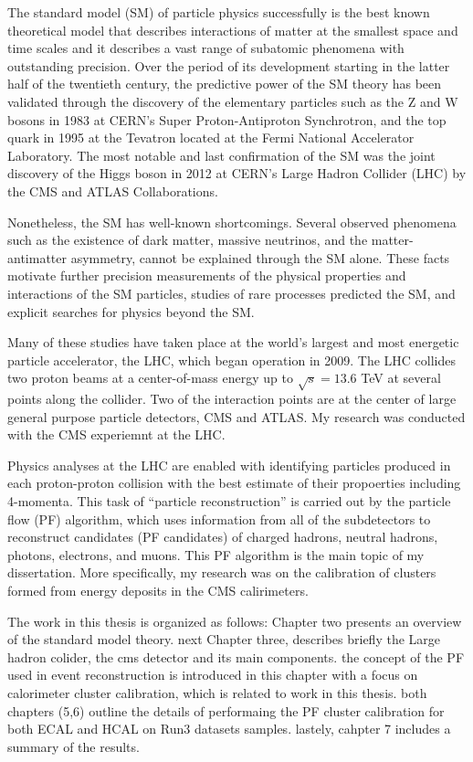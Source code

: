 
The standard model (SM) of particle physics successfully is the best known theoretical model that describes interactions of matter at the smallest space and time scales
and it describes a vast range of subatomic phenomena with outstanding precision.
Over the period of its development starting in the latter half of the twentieth century, the predictive power of the SM theory has been validated through the discovery of the elementary particles such as the Z and W bosons in 1983 at CERN's Super Proton-Antiproton Synchrotron, and the top quark in 1995 at the Tevatron located at the Fermi National Accelerator Laboratory.
The most notable and last confirmation of the SM was the joint discovery of the Higgs boson in 2012 at CERN's Large Hadron Collider (LHC) by the CMS and ATLAS Collaborations.

Nonetheless, the SM has well-known shortcomings.
Several observed phenomena such as the existence of dark matter, massive neutrinos, and the matter-antimatter asymmetry, cannot be explained through the SM alone.
These facts motivate further precision measurements of the physical properties and interactions of the SM particles, studies of rare processes predicted the SM, and explicit searches for physics beyond the SM.

Many of these studies have taken place at the world's largest and most energetic particle accelerator, the LHC, which began operation in 2009.
The LHC collides two proton beams at a center-of-mass energy up to $\sqrt{s}=13.6$ TeV at several points along the collider.
Two of the interaction points are at the center of large general purpose particle detectors, CMS and ATLAS.
My research was conducted with the CMS experiemnt at the LHC.

Physics analyses at the LHC are enabled with identifying particles produced in each proton-proton collision with the best estimate of their propoerties including 4-momenta.
This task of ``particle reconstruction'' is carried out by the particle flow (PF) algorithm, which uses information from all of the subdetectors
to reconstruct candidates (PF candidates) of charged hadrons, neutral hadrons, photons, electrons, and muons.
This PF algorithm is the main topic of my dissertation.
More specifically, my research was on the calibration of clusters formed from energy deposits in the CMS calirimeters.


The work in this thesis is organized as follows:
Chapter two presents an overview of the standard model theory. 
next Chapter three, describes briefly the Large hadron colider, the cms detector and its main components. 
the concept of the PF used in event reconstruction  is introduced in this chapter with a focus on calorimeter cluster calibration, which is related to work in this thesis. 
both chapters (5,6) outline the details of performaing the PF cluster calibration for both ECAL and HCAL on Run3 datasets samples. 
lastely, cahpter 7 includes a summary of the results. 
